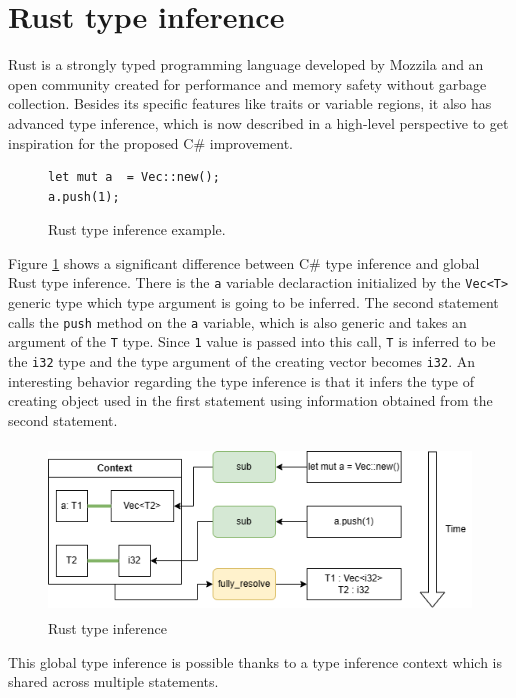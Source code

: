 \section{Rust type inference}

Rust is a strongly typed programming language developed by Mozzila and an open community created for performance and memory safety without garbage collection. 
Besides its specific features like traits or variable regions, it also has advanced type inference, which is now described in a high-level perspective to get inspiration for the proposed C\# improvement.
\par
\begin{figure}[h]
\begin{lstlisting}
let mut a  = Vec::new();
a.push(1);
\end{lstlisting}
\caption{Rust type inference example.}
\label{img17:rustCodeExample}
\end{figure}
Figure \ref{img17:rustCodeExample} shows a significant difference between C\# type inference and global Rust type inference.
There is the \texttt{a} variable declaraction initialized by the \texttt{Vec<T>} generic type which type argument is going to be inferred.
The second statement calls the \texttt{push} method on the \texttt{a} variable, which is also generic and takes an argument of the \texttt{T} type.
Since \texttt{1} value is passed into this call, \texttt{T} is inferred to be the \texttt{i32} type and the type argument of the creating vector becomes \texttt{i32}.
An interesting behavior regarding the type inference is that it infers the type of creating object used in the first statement using information obtained from the second statement.
\begin{figure}[h]
\centering
\includegraphics[width=120mm, height=45mm]{./img/RustTypeInference.png}
\caption{Rust type inference}
\label{img18:rustTypeInference}
\end{figure}
\par
\par
This global type inference is possible thanks to a type inference context which is shared across multiple statements. 
